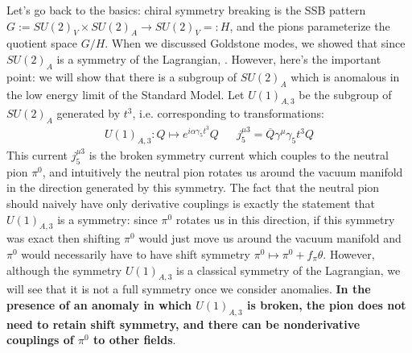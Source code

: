 \documentclass[11pt, oneside]{article}   	%
\theoremstyle{definition}
\numberwithin{equation}{subsection}		%
\begin{document}
Let's go back to the basics: chiral symmetry breaking is the SSB pattern $G := SU(2)_V\times SU(2)_A\rightarrow SU(2)_V =: H$, and the 
pions parameterize the quotient space $G / H$. When we discussed Goldstone modes, we showed that since $SU(2)_A$ is a symmetry 
of the Lagrangian, . However, here's the important point: we will show that there is a subgroup of $SU(2)_A$ which is anomalous in the 
low energy limit of the Standard Model. Let $U(1)_{A, 3}$ be the subgroup of $SU(2)_A$ generated by $t^3$, i.e. corresponding to 
transformations:
\begin{align}
	U(1)_{A, 3} : Q\mapsto e^{i\alpha\gamma_5 t^3} Q && j^{\mu 3}_5 = \overline Q \gamma^\mu\gamma_5 t^3 Q
\end{align}
This current $j^{\mu 3}_5$ is the broken symmetry current which couples to the neutral pion $\pi^0$, and intuitively the neutral pion rotates 
us around the vacuum manifold in the direction generated by this symmetry. The fact that the neutral pion should naively have only 
derivative couplings is exactly the statement that $U(1)_{A, 3}$ is a symmetry: since $\pi^0$ rotates us in this direction, if this symmetry 
was exact then shifting $\pi^0$ would just move us around the vacuum manifold and $\pi^0$ would necessarily have to have shift 
symmetry $\pi^0\mapsto \pi^0 + f_\pi\theta$. However, although the symmetry $U(1)_{A, 3}$ is a classical symmetry of the 
Lagrangian, we will see that it is not a full symmetry once we consider anomalies. \textbf{In the presence of an anomaly in which $U(1)_{A, 
3}$ is broken, the pion does not need to retain shift symmetry, and there can be nonderivative couplings of $\pi^0$ to other fields}.
\end{document}
